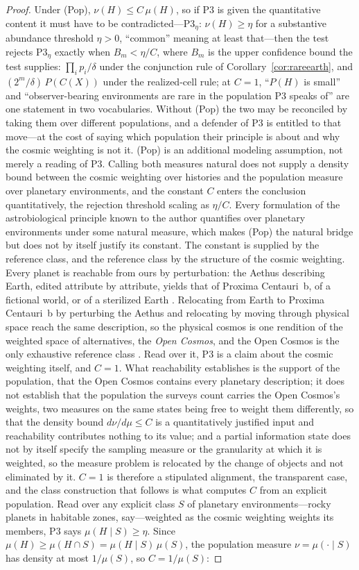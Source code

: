 \begin{proof}
Under (Pop), $\nu(H) \le C\,\mu(H)$, so if P3 is given the quantitative content it must have to be contradicted---$\mathrm{P3}_\eta$: $\nu(H) \ge \eta$ for a substantive abundance threshold $\eta > 0$, ``common'' meaning at least that---then the test rejects $\mathrm{P3}_\eta$ exactly when $B_m < \eta/C$, where $B_m$ is the upper confidence bound the test supplies: $\prod_i p_i/\delta$ under the conjunction rule of Corollary~\ref{cor:rareearth}, and $(2^m/\delta)\,P(C(X))$ under the realized-cell rule; at $C = 1$, ``$P(H)$ is small'' and ``observer-bearing environments are rare in the population P3 speaks of'' are one statement in two vocabularies. Without (Pop) the two may be reconciled by taking them over different populations, and a defender of P3 is entitled to that move---at the cost of saying which population their principle is about and why the cosmic weighting is not it. (Pop) is an additional modeling assumption, not merely a reading of P3. Calling both measures natural does not supply a density bound between the cosmic weighting over histories and the population measure over planetary environments, and the constant $C$ enters the conclusion quantitatively, the rejection threshold scaling as $\eta/C$. Every formulation of the astrobiological principle known to the author quantifies over planetary environments under some natural measure, which makes (Pop) the natural bridge but does not by itself justify its constant. The constant is supplied by the reference class, and the reference class by the structure of the cosmic weighting. Every planet is reachable from ours by perturbation: the Aethus describing Earth, edited attribute by attribute, yields that of Proxima Centauri~b, of a fictional world, or of a sterilized Earth \cite{Nexus}. Relocating from Earth to Proxima Centauri~b by perturbing the Aethus and relocating by moving through physical space reach the same description, so the physical cosmos is one rendition of the weighted space of alternatives, the \emph{Open Cosmos}, and the Open Cosmos is the only exhaustive reference class \cite{Nexus, Aethus}. Read over it, P3 is a claim about the cosmic weighting itself, and $C = 1$. What reachability establishes is the support of the population, that the Open Cosmos contains every planetary description; it does not establish that the population the surveys count carries the Open Cosmos's weights, two measures on the same states being free to weight them differently, so that the density bound $d\nu/d\mu \le C$ is a quantitatively justified input and reachability contributes nothing to its value; and a partial information state does not by itself specify the sampling measure or the granularity at which it is weighted, so the measure problem is relocated by the change of objects and not eliminated by it. $C = 1$ is therefore a stipulated alignment, the transparent case, and the class construction that follows is what computes $C$ from an explicit population. Read over any explicit class $S$ of planetary environments---rocky planets in habitable zones, say---weighted as the cosmic weighting weights its members, P3 says $\mu(H \mid S) \ge \eta$. Since $\mu(H) \ge \mu(H \cap S) = \mu(H \mid S)\,\mu(S)$, the population measure $\nu = \mu(\cdot \mid S)$ has density at most $1/\mu(S)$, so $C = 1/\mu(S)$: 
\end{proof}
